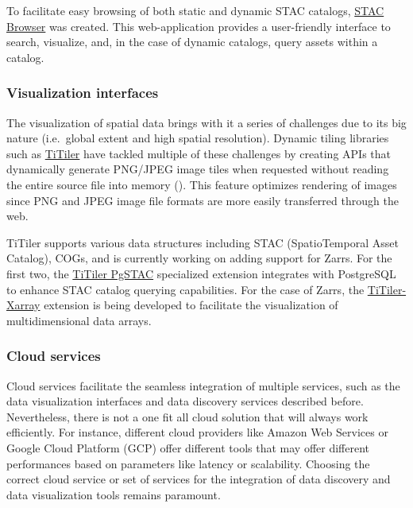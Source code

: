 \documentclass[
  oneside,
  open=any]{scrbook}
\begin{document}
To facilitate easy browsing of both static and dynamic STAC catalogs,
\href{https://github.com/radiantearth/stac-browser}{STAC Browser} was
created. This web-application provides a user-friendly interface to
search, visualize, and, in the case of dynamic catalogs, query assets
within a catalog.

\subsubsection*{Visualization
interfaces}\label{visualization-interfaces}

The visualization of spatial data brings with it a series of challenges
due to its big nature (i.e.~global extent and high spatial resolution).
Dynamic tiling libraries such as
\href{https://developmentseed.org/titiler/}{TiTiler} have tackled
multiple of these challenges by creating APIs that dynamically generate
PNG/JPEG image tiles when requested without reading the entire source
file into memory
(). This
feature optimizes rendering of images since PNG and JPEG image file
formats are more easily transferred through the web.

TiTiler supports various data structures including STAC (SpatioTemporal
Asset Catalog), COGs, and is currently working on adding support for
Zarrs. For the first two, the
\href{https://github.com/stac-utils/titiler-pgstac}{TiTiler PgSTAC}
specialized extension integrates with PostgreSQL to enhance STAC catalog
querying capabilities. For the case of Zarrs, the
\href{https://github.com/developmentseed/titiler-xarray}{TiTiler-Xarray}
extension is being developed to facilitate the visualization of
multidimensional data arrays.

\subsubsection*{Cloud services}\label{cloud-services}

Cloud services facilitate the seamless integration of multiple services,
such as the data visualization interfaces and data discovery services
described before. Nevertheless, there is not a one fit all cloud
solution that will always work efficiently. For instance, different
cloud providers like Amazon Web Services or Google Cloud Platform (GCP)
offer different tools that may offer different performances based on
parameters like latency or scalability. Choosing the correct cloud
service or set of services for the integration of data discovery and
data visualization tools remains paramount.
\end{document}
